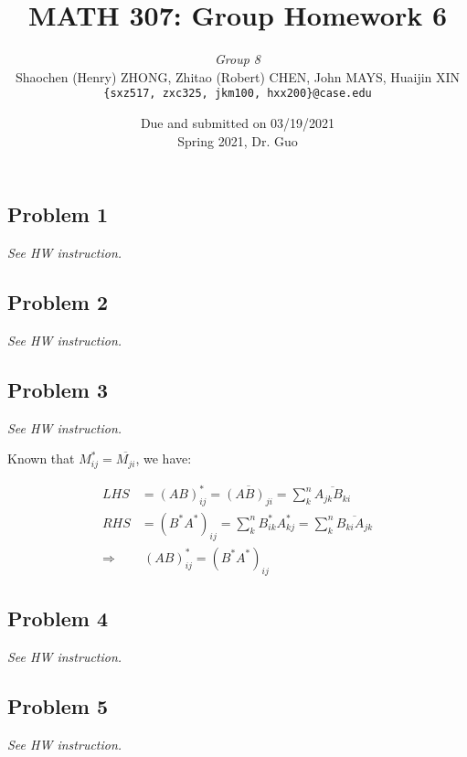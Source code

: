 \documentclass[11pt]{article}
\newcommand{\ilc}{\texttt}
\begin{document}
\title{\textbf{MATH 307: Group Homework 6}}


\author{\textit{Group 8}\\
Shaochen (Henry) ZHONG, Zhitao (Robert) CHEN, John MAYS, Huaijin XIN\\ \ilc{\{sxz517, zxc325, jkm100, hxx200\}@case.edu}}

\date{Due and submitted on 03/19/2021 \\ Spring 2021, Dr. Guo}
\maketitle




\subsection*{Problem 1}
\textit{See HW instruction.}\newline

\subsection*{Problem 2}
\textit{See HW instruction.}\newline

\subsection*{Problem 3}
\textit{See HW instruction.}\newline

Known that $M_{ij}^* = \overline{M_{ji}}$, we have:

\begin{align*}
    LHS &= (AB)^*_{ij} = \overline{(AB)_{ji}} = \sum^{n}_{k} \overline{A_{jk} B_{ki}} \\
    RHS &= (B^* A^*)_{ij} = \sum^{n}_{k} B^{*}_{ik} A^{*}_{kj} = \sum^{n}_{k} \overline{B_{ki} A_{jk}} \\
    \Longrightarrow& \  (AB)^*_{ij} = (B^* A^*)_{ij}
\end{align*}

\subsection*{Problem 4}
\textit{See HW instruction.}\newline

\subsection*{Problem 5}
\textit{See HW instruction.}\newline
\end{document}
